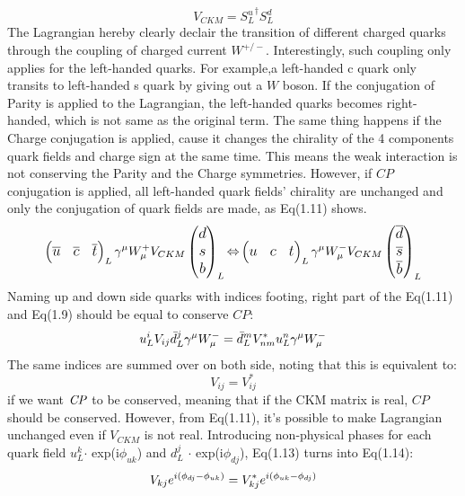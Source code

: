 \begin{equation}
V_{CKM} = 
{S^{u}_{L}}^{\dag}
S^{d}_{L}
\end{equation}
The Lagrangian hereby clearly declair the transition of different charged quarks through the coupling of charged current $W^{+/-}$. Interestingly, such coupling only applies for the left-handed quarks. For example,a left-handed c quark only transits to left-handed s quark by giving out a $W$ boson. If the conjugation of Parity is applied to the Lagrangian, the left-handed quarks becomes right-handed, which is not same as the original term. The same thing happens if the Charge conjugation is applied, cause it changes the chirality of the 4 components quark fields and charge sign at the same time. This means the weak interaction is not conserving the Parity and the Charge symmetries. However, if $CP$ conjugation is applied, all left-handed quark fields' chirality are  unchanged and only the conjugation of quark fields are made, as Eq(1.11) shows.
\begin{equation}
\large
\begin{pmatrix}
\overline{u}&\overline{c}&\overline{t}
\end{pmatrix}_L
\gamma^\mu W^{+}_{\mu}
V_{CKM}
\begin{pmatrix}
d\\s\\b\\
\end{pmatrix}_L
{\Leftrightarrow}
\begin{pmatrix}
{u}&{c}&{t}
\end{pmatrix}_L
\gamma^\mu W^{-}_{\mu}
{V_{CKM}}
\begin{pmatrix}
\overline d\\\overline s\\\overline b\\
\end{pmatrix}_L
\end{equation} 
Naming up and down side quarks with indices footing, right part of the Eq(1.11) and Eq(1.9) should be equal to conserve $CP$: 
\begin{equation}
\large
{u_{L}^i}V_{ij} \bar{d}^{j}_L \gamma^\mu W^{-}_{\mu}
=
{\bar{d}_{L}^m}V^{*}_{nm} {u}^{n}_L \gamma^\mu W^{-}_{\mu}
\end{equation}
The same indices are summed over on both side, noting that this is equivalent to: 
\begin{equation}
V_{ij} = V^{*}_{ij}
\end{equation}
if we want $\it{CP}$ to be conserved, meaning that if the CKM matrix is real, $CP$ should be conserved. However, from Eq(1.11), it's possible to make Lagrangian unchanged even if $V_{CKM}$ is not real. Introducing non-physical phases for each quark field $u^k_L$$\cdot$ exp(i$\phi_{uk}$) and $d^j_L$ $\cdot$ exp(i$\phi_{dj}$), Eq(1.13) turns into Eq(1.14):
\begin{equation}
\large
V_{kj} e^{i(\phi_{dj}-\phi_{uk})} = V^{*}_{kj}e^{i(\phi_{uk}-\phi_{dj})}
\end{equation}

